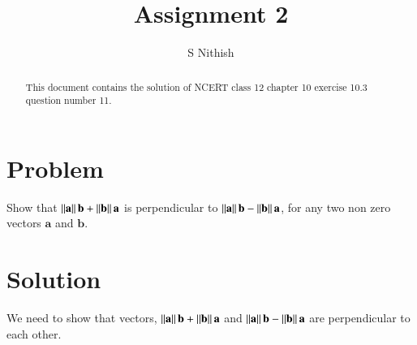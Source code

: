 \documentclass[journal,11pt,twocolumn]{IEEEtran}
\begin{document}
\let\StandardTheFigure\thefigure
\let\vec\mathbf
\renewcommand{\thefigure}{\theproblem}



\def\putbox#1#2#3{\makebox[0in][l]{\makebox[#1][l]{}\raisebox{\baselineskip}[0in][0in]{\raisebox{#2}[0in][0in]{#3}}}}
     \def\rightbox#1{\makebox[0in][r]{#1}}
     \def\centbox#1{\makebox[0in]{#1}}
     \def\topbox#1{\raisebox{-\baselineskip}[0in][0in]{#1}}
     \def\midbox#1{\raisebox{-0.5\baselineskip}[0in][0in]{#1}}

\vspace{3cm}


\title{Assignment 2}
\author{S Nithish}





\maketitle

\newpage


\bigskip

\renewcommand{\thefigure}{\theenumi}
\renewcommand{\thetable}{\theenumi}


\begin{abstract}
This document contains the solution of NCERT class 12 chapter 10 exercise 10.3 question number 11.
\end{abstract}


\section{Problem}
Show that $\norm{\vec{a}}\vec{b}+\norm{\vec{b}}\vec{a}$ is perpendicular to $\norm{\vec{a}}\vec{b}-\norm{\vec{b}}\vec{a}$, for any two non zero vectors $\vec{a}$ and $\vec{b}$.

\section{Solution}
We need to show that vectors, $\norm{\vec{a}}\vec{b}+\norm{\vec{b}}\vec{a}$ and $\norm{\vec{a}}\vec{b}-\norm{\vec{b}}\vec{a}$ are perpendicular to each other.
\end{document}
